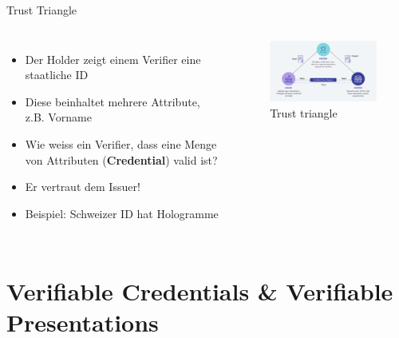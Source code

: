 \documentclass[
	german,%
	authorontitle=true,
	]{bfhbeamer}
\begin{document}
\begin{frame}{Trust Triangle}
    \begin{columns}[onlytextwidth,T]
        \column{70mm}  
        \begin{itemize}
            \item Der Holder zeigt einem Verifier eine staatliche ID 
            \item Diese beinhaltet mehrere Attribute, z.B. Vorname
            \item Wie weiss ein Verifier, dass eine Menge von Attributen (\textbf{Credential}) valid ist?
            \item Er vertraut dem Issuer!
            \item Beispiel: Schweizer ID hat Hologramme
        \end{itemize}

        \column{70mm}

        \begin{figure}
            \centering
            \includegraphics[width=70mm]{../img/trusttriangle.png}
            \caption{Trust triangle}
        \end{figure}
        
    \end{columns}
\end{frame}

\section{Verifiable Credentials \& Verifiable Presentations}
\end{document}
